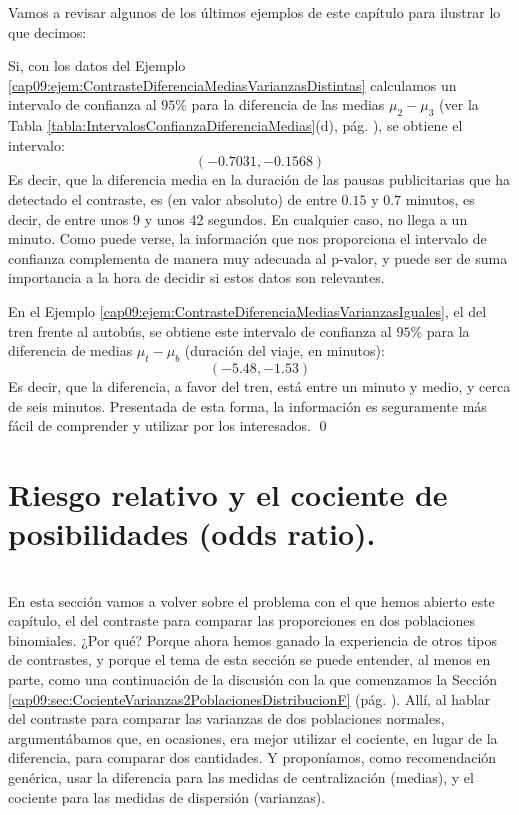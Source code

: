 Vamos a revisar algunos de los últimos ejemplos de este capítulo para ilustrar lo que decimos:
\begin{ejemplo}
Si, con los datos del Ejemplo \ref{cap09:ejem:ContrasteDiferenciaMediasVarianzasDistintas} calculamos un intervalo de confianza al $95\%$ para la diferencia de las medias $\mu_2-\mu_3$ (ver la Tabla \ref{tabla:IntervalosConfianzaDiferenciaMedias}(d), pág. \pageref{tabla:IntervalosConfianzaDiferenciaMedias}), se obtiene el intervalo:
\[(-0.7031, -0.1568)\]
Es decir, que la diferencia media en la duración de las pausas publicitarias que ha detectado el contraste, es (en valor absoluto) de entre $0.15$ y $0.7$ minutos, es decir, de entre unos 9 y unos 42 segundos. En cualquier caso, no llega a  un minuto. Como puede verse, la información que nos proporciona el intervalo de confianza complementa de manera muy adecuada al p-valor, y puede ser de suma importancia a la hora de decidir si estos datos son relevantes.

En el Ejemplo \ref{cap09:ejem:ContrasteDiferenciaMediasVarianzasIguales}, el del tren frente al autobús, se obtiene este intervalo de confianza al $95\%$ para la diferencia de medias $\mu_t-\mu_b$ (duración del viaje, en minutos):
\[(-5.48, -1.53)\]
Es decir, que la diferencia, a favor del tren, está entre un minuto y medio, y cerca de seis minutos. Presentada de esta forma, la información es seguramente más fácil de comprender y utilizar por los interesados.
\qed
\end{ejemplo}


\section{Riesgo relativo y el cociente de posibilidades (odds ratio).}
\label{cap09:sec:RiesgoRelativoCocienteProbabilidades}
\\

En esta sección vamos a volver sobre el problema con el que hemos abierto este capítulo, el del contraste para comparar las proporciones en dos poblaciones binomiales. ¿Por qué? Porque ahora hemos ganado la experiencia de otros tipos de contrastes, y porque el tema de esta sección se puede entender, al menos en parte, como una continuación de la discusión con la que comenzamos la Sección \ref{cap09:sec:CocienteVarianzas2PoblacionesDistribucionF} (pág. \pageref{cap09:sec:CocienteVarianzas2PoblacionesDistribucionF}). Allí, al hablar del contraste para comparar las varianzas de dos poblaciones normales, argumentábamos que, en ocasiones, era mejor utilizar el cociente, en lugar de la diferencia, para comparar dos cantidades. Y proponíamos, como recomendación genérica, usar la diferencia para las medidas de centralización (medias), y el cociente para las medidas de dispersión (varianzas).


